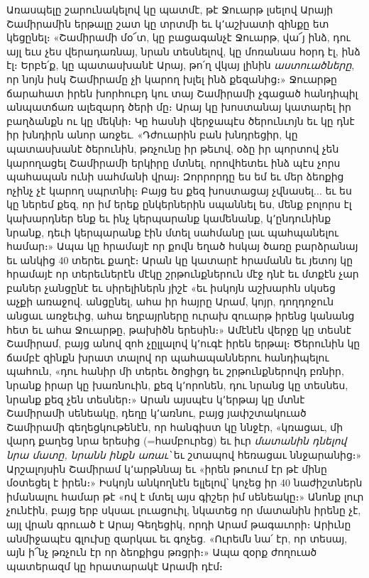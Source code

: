 \documentclass{article}
\begin{document}
{Առասպելը շարունակելով կը պատմէ, թէ Ջուարթ լսելով Արայի Շամիրամին երթալը շատ կը տրտմի եւ կ՚աշխատի զինքը ետ կեցընել։ «Շամիրամի մօ՜տ, կը բացագանչէ Ջուարթ, վա՜յ ինձ, դու այլ եւս չես վերադառնայ, նրան տեսնելով, կը մոռանաս հօրդ էլ, ինձ էլ։ Երբե՛ք, կը պատասխանէ Արայ, թո՛ղ վկայ լինին \emph{աստուածները}, որ նոյն իսկ Շամիրամը չի կարող խլել ինձ քեզանից։» Ջուարթը ճարահատ իրեն խորհուբդ կու տայ Շամիրամի չգացած հանդիպիլ անպատճառ ալեզարդ ծերի մը։ Արայ կը խոստանայ կատարել իր բաղձանքն ու կը մեկնի։ Կը հասնի վերջապէս ծերունւոյն եւ կը դնէ իր խնդիրն անոր առջեւ. «Դժուարին բան խնդրեցիր, կը պատասխանէ ծերունին, թռչունը իր թեւով, օձը իր պորտով չեն կարողացել Շամիրամի երկիրը մտնել, որովհետեւ ինձ պէս չորս պահապան ունի սահմանի վրայ։ Զորրորդը ես եմ եւ մեր ձեոքից ոչինչ չէ կարող սպրտնիլ։ Բայց ես քեզ խոստացայ չվնասել... եւ ես կը ներեմ քեզ, որ իմ երեք ընկերներին սպաննել ես, մենք բոլորս էլ կախարդներ ենք եւ ինչ կերպարանք կամենանք, կ՚ընդունինք նրանք, դեւի կերպարանք էին մտել սահմանը լաւ պահպանելու համար։» Ապա կը հրամայէ որ քովն եղած հսկայ ծառը բարձրանայ եւ անկից 40 տերեւ քաղէ։ Արան կը կատարէ հրամանն եւ յետոյ կը հրամայէ որ տերեւներէն մէկը շրթունքներուն մէջ դնէ եւ մտքէն չար բաներ չանցընէ եւ սիրելիներն յիշէ «եւ իսկոյն աշխարհն սկսեց աչքի առաջով. անցընել, ահա իր հայրը Արամ, կոյր, դողդոջուն անցաւ առջեւից, ահա եղբայրները ուրախ զուարթ իրենց կանանց հետ եւ ահա Ջուարթը, թախիծն երեսին։» Ամէնէն վերջը կը տեսնէ Շամիրամ, բայց անով զոհ չըլլալով կ՚ուգէ իրեն երթալ։ Ծերունին կը ճամբէ զինքն խրատ տալով որ պահապաններու հանդիպելու պահուն, «դու հանիր մի տերեւ ծոցիցդ եւ շրթունքներովդ բռնիր, նրանք իրար կը խառնուին, քեզ կ՚որոնեն, դու նրանց կը տեսնես, նրանք քեզ չեն տեսներ։» Արան այսպէս կ՚երթայ կը մտնէ Շամիրամի սենեակը, դեղը կ՚առնու, բայց յափշտակուած Շամիրամի գեղեցկութենէն, որ հանգիստ կը ննջէր, «կռացաւ, մի վարդ քաղեց նրա երեսից (=համբուրեց) եւ իւր \emph{մատանին դնելով նրա մատը, նրանն ինքն առաւ՝} եւ շտապով հեռացաւ ննջարանից։» Արշալոյսին Շամիրամ կ՚արթննայ եւ «իրեն թուում էր թէ մինը մօտեցել է իրեն։» Իսկոյն անկողնէն ելլելով՝ կոչեց իր 40 նաժիշտներն իմանալու համար թէ «ով է մտել այս գիշեր իմ սենեակը։» Անոնք լուր չունէին, բայց երբ սկսաւ լուացուիլ, նկատեց որ մատանին իրենը չէ, այլ վրան գրուած է Արայ Գեղեցիկ, որդի Արամ թագաւորի։ Արիւնը անմիջապէս գլուխը զարկաւ եւ գոչեց. «Ուրեմն նա՛ էր, որ տեսայ, այն ի՜նչ թռչուն էր որ ձեոքիցս թռցրի։» Ապա զօրք ժողուած պատերազմ կը հրատարակէ Արամի դէմ։

}
\end{document}
